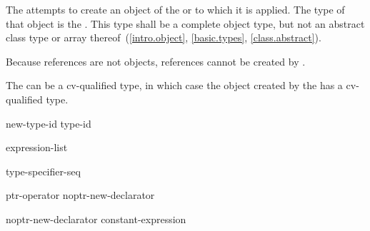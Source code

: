 \pnum
{}%
%
%
%
%
%
%
%
The  attempts to create an object of the
 or  to which
it is applied. The type of that object is the .
%
This type shall be a complete object type, but not an abstract class
type or array
thereof~(\ref{intro.object}, \ref{basic.types}, \ref{class.abstract}).
\begin{note}
Because references are not objects, references cannot be created by
.
\end{note}
\begin{note}
The  can be a cv-qualified type, in which case the
object created by the  has a cv-qualified type.
\end{note}

\begin{bnf}
\br
    \opt{\terminal{::}}   new-type-id  \br
    \opt{\terminal{::}}   \terminal{(} type-id \terminal{)} 
\end{bnf}

%
%
\begin{bnf}
\br
    \terminal{(} expression-list \terminal{)}
\end{bnf}

\begin{bnf}
\br
    type-specifier-seq 
\end{bnf}

\begin{bnf}
\br
    ptr-operator  \br
    noptr-new-declarator
\end{bnf}

\begin{bnf}
\br
    \terminal{[}  \terminal{]} \br
    noptr-new-declarator \terminal{[} constant-expression \terminal{]} 
\end{bnf}

